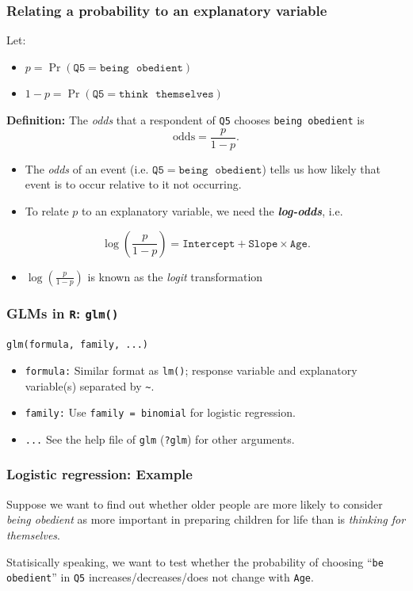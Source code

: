 \documentclass{beamer}\usepackage[]{graphicx}\usepackage[]{color}
\begin{document}
\begin{frame}[fragile]
\frametitle{Relating a probability to an explanatory variable}
Let:
\begin{itemize}
  \item $p = \Pr\left(\mathtt{Q5} = \mathtt{being}\mbox{ }\mathtt{obedient} \right)$
  \item $1-p = \Pr\left(\mathtt{Q5} = \mathtt{think}\mbox{ }\mathtt{themselves} \right)$
\end{itemize}
\vspace{0.2cm}
\textbf{Definition:} The \emph{odds} that a respondent of \texttt{Q5} chooses \texttt{being\mbox{ }obedient} is
\[ \text{odds} = \frac{p}{1-p}. \]
\begin{itemize}
\item The \emph{odds} of an event (i.e.  $\mathtt{Q5} = \mathtt{being}\mbox{ } \mathtt{obedient}$) 
tells us how likely that event is to occur relative to it not
occurring.
\item To relate $p$ to an explanatory variable, we need the \textbf{\emph{log-odds}}, i.e.
\end{itemize}
\[ \log\left(\frac{p}{1-p}\right) = \mathtt{Intercept} + \mathtt{Slope} \times \mathtt{Age}. \]
\begin{itemize}
\item $\log\left(\frac{p}{1-p}\right)$ is known as the \emph{logit} transformation
\end{itemize}
\end{frame}



\begin{frame}[fragile]
\frametitle{GLMs in \texttt{R}: \texttt{glm()}}
\texttt{glm(formula, family, ...)}
\begin{itemize}
\item \texttt{formula:} Similar format as \texttt{lm()}; response
variable and explanatory variable(s) separated by \verb|~|.
\item \texttt{family:} Use \texttt{family = binomial} for logistic
regression.
\item \texttt{...} See the help file of \texttt{glm} (\texttt{?glm})
for other arguments.
\end{itemize}
\end{frame}


\begin{frame}[fragile]
\frametitle{Logistic regression: Example}
Suppose we want to find out whether older people are more likely to consider {\em being obedient} as more important in preparing children for life than is {\em thinking for themselves}.\\\vspace{0.5cm}

Statisically speaking, we want to test whether the probability of choosing ``\texttt{be obedient}'' in \texttt{Q5} increases/decreases/does not change with \texttt{Age}.
\end{frame}
\end{document}

